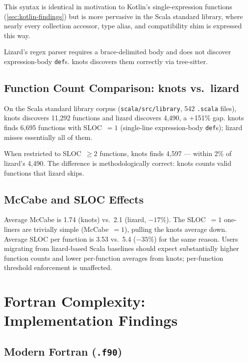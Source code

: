 \documentclass[10pt,twocolumn,letterpaper]{article}
\begin{document}
This syntax is identical in motivation to Kotlin's single-expression
functions (\cref{sec:kotlin-findings}) but is more pervasive in the
Scala standard library, where nearly every collection accessor, type
alias, and compatibility shim is expressed this way.

Lizard's regex parser requires a brace-delimited body and does not
discover expression-body \texttt{def}s.  knots discovers them correctly
via tree-sitter.

\subsection{Function Count Comparison: knots vs.\ lizard}

On the Scala standard library corpus (\texttt{scala/src/library},
542 \texttt{.scala} files), knots discovers 11{,}292 functions and
lizard discovers 4{,}490, a $+$151\% gap.  knots finds 6{,}695 functions
with SLOC~$= 1$ (single-line expression-body \texttt{def}s); lizard
misses essentially all of them.

When restricted to SLOC~$\geq 2$ functions, knots finds 4{,}597 ---
within 2\% of lizard's 4{,}490.  The difference is methodologically
correct: knots counts valid functions that lizard skips.

\subsection{McCabe and SLOC Effects}

Average McCabe is 1.74 (knots) vs.\ 2.1 (lizard, $-17\%$).  The
SLOC~$= 1$ one-liners are trivially simple (McCabe~$= 1$), pulling
the knots average down.  Average SLOC per function is 3.53 vs.\
5.4 ($-35\%$) for the same reason.  Users migrating from lizard-based
Scala baselines should expect substantially higher function counts and
lower per-function averages from knots; per-function threshold
enforcement is unaffected.

\section{Fortran Complexity: Implementation Findings}
\label{sec:fortran-findings}

\subsection{Modern Fortran (\texttt{.f90})}
\end{document}
